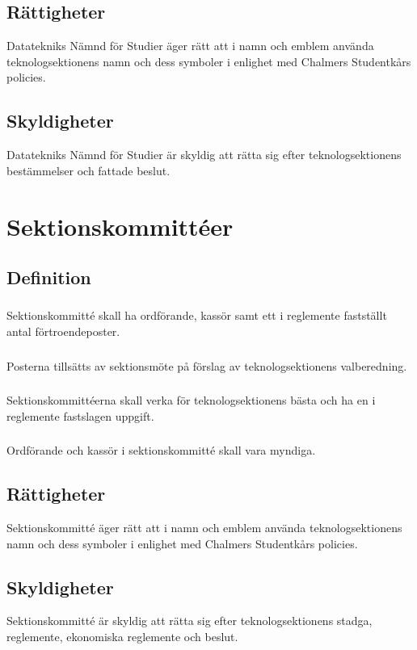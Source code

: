 \documentclass[a4paper]{dtek}
\begin{document}
\subsection{Rättigheter}
Datatekniks Nämnd för Studier äger rätt att i namn och emblem använda teknologsektionens namn och dess symboler i enlighet med Chalmers Studentkårs policies.
\subsection{Skyldigheter}
Datatekniks Nämnd för Studier är skyldig att rätta sig efter teknologsektionens bestämmelser och fattade beslut.
\newpage

\section{Sektionskommittéer}
\subsection{Definition}
\subsubsection{}
Sektionskommitté skall ha ordförande, kassör samt ett i reglemente fastställt antal förtroendeposter.
\subsubsection{}
Posterna tillsätts av sektionsmöte på förslag av teknologsektionens valberedning.
\subsubsection{}
Sektionskommittéerna skall verka för teknologsektionens bästa och ha en i reglemente fastslagen uppgift.
\subsubsection{}
Ordförande och kassör i sektionskommitté skall vara myndiga.
\subsection{Rättigheter}
Sektionskommitté äger rätt att i namn och emblem använda teknologsektionens namn och dess symboler i enlighet med Chalmers Studentkårs policies.
\subsection{Skyldigheter}
Sektionskommitté är skyldig att rätta sig efter teknologsektionens stadga, reglemente, ekonomiska reglemente och beslut.
\end{document}
